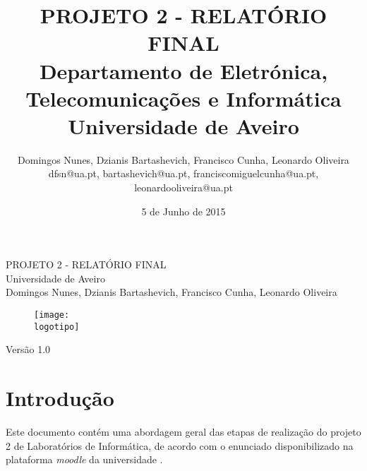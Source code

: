\documentclass{report}
\begin{document}
%
\def\titulo{PROJETO 2 - RELATÓRIO FINAL}
\def\data{5 de Junho de 2015}
\def\autores{Domingos Nunes, Dzianis Bartashevich, Francisco Cunha, Leonardo Oliveira}
\def\autorescontactos{dfsn@ua.pt, bartashevich@ua.pt, franciscomiguelcunha@ua.pt, leonardooliveira@ua.pt}
\def\versao{Versão 1.0}
\def\departamento{Departamento de Eletrónica, Telecomunicações e Informática}
\def\empresa{Universidade de Aveiro}
\def\logotipo{images/ua.pdf}
%
%
\begin{titlepage}

\begin{center}
%
\vspace*{50mm}
%
{\Huge \titulo}\\ 
%
\vspace{10mm}
%
{\Large \empresa}\\
%
\vspace{10mm}
%
{\LARGE \autores}\\ 
%
%
\vspace{30mm}
%
\begin{figure}[h]
\center
\texttt{[image: \\logotipo]}
\end{figure}
%
\vspace{20mm}
\end{center}
%
\begin{flushright}
\versao
\end{flushright}
\end{titlepage}

%
%
%
%
\title{%
{\Huge\textbf{\titulo}}\\
{\Large \departamento\\ \empresa}
}
%
\author{%
    \autores \\
    \autorescontactos
}
%
\date{\data}
%
\maketitle
%
%



\tableofcontents
\listoffigures


\clearpage
{}

\chapter{Introdução}
\label{chap.introducao}
Este documento contém uma abordagem geral das etapas de realização do projeto 2 de Laboratórios de Informática, de acordo com o enunciado disponibilizado na plataforma \textit{moodle} da universidade \cite{moodle}.
\end{document}
